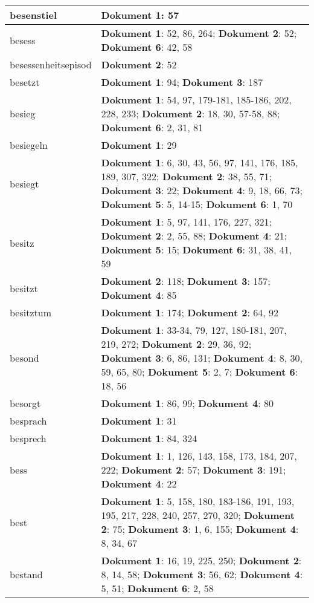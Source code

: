 \documentclass[a5paper]{article}
\begin{document}
\begin{longtable}[l]{|l|p{3in}|}
\hline
besenstiel & \textbf{Dokument 1}: 57 \\
\hline
besess & \textbf{Dokument 1}: 52, 86, 264; \textbf{Dokument 2}: 52; \textbf{Dokument 6}: 42, 58 \\
\hline
besessenheitsepisod & \textbf{Dokument 2}: 52 \\
\hline
besetzt & \textbf{Dokument 1}: 94; \textbf{Dokument 3}: 187 \\
\hline
besieg & \textbf{Dokument 1}: 54, 97, 179-181, 185-186, 202, 228, 233; \textbf{Dokument 2}: 18, 30, 57-58, 88; \textbf{Dokument 6}: 2, 31, 81 \\
\hline
besiegeln & \textbf{Dokument 1}: 29 \\
\hline
besiegt & \textbf{Dokument 1}: 6, 30, 43, 56, 97, 141, 176, 185, 189, 307, 322; \textbf{Dokument 2}: 38, 55, 71; \textbf{Dokument 3}: 22; \textbf{Dokument 4}: 9, 18, 66, 73; \textbf{Dokument 5}: 5, 14-15; \textbf{Dokument 6}: 1, 70 \\
\hline
besitz & \textbf{Dokument 1}: 5, 97, 141, 176, 227, 321; \textbf{Dokument 2}: 2, 55, 88; \textbf{Dokument 4}: 21; \textbf{Dokument 5}: 15; \textbf{Dokument 6}: 31, 38, 41, 59 \\
\hline
besitzt & \textbf{Dokument 2}: 118; \textbf{Dokument 3}: 157; \textbf{Dokument 4}: 85 \\
\hline
besitztum & \textbf{Dokument 1}: 174; \textbf{Dokument 2}: 64, 92 \\
\hline
besond & \textbf{Dokument 1}: 33-34, 79, 127, 180-181, 207, 219, 272; \textbf{Dokument 2}: 29, 36, 92; \textbf{Dokument 3}: 6, 86, 131; \textbf{Dokument 4}: 8, 30, 59, 65, 80; \textbf{Dokument 5}: 2, 7; \textbf{Dokument 6}: 18, 56 \\
\hline
besorgt & \textbf{Dokument 1}: 86, 99; \textbf{Dokument 4}: 80 \\
\hline
besprach & \textbf{Dokument 1}: 31 \\
\hline
besprech & \textbf{Dokument 1}: 84, 324 \\
\hline
bess & \textbf{Dokument 1}: 1, 126, 143, 158, 173, 184, 207, 222; \textbf{Dokument 2}: 57; \textbf{Dokument 3}: 191; \textbf{Dokument 4}: 22 \\
\hline
best & \textbf{Dokument 1}: 5, 158, 180, 183-186, 191, 193, 195, 217, 228, 240, 257, 270, 320; \textbf{Dokument 2}: 75; \textbf{Dokument 3}: 1, 6, 155; \textbf{Dokument 4}: 8, 34, 67 \\
\hline
bestand & \textbf{Dokument 1}: 16, 19, 225, 250; \textbf{Dokument 2}: 8, 14, 58; \textbf{Dokument 3}: 56, 62; \textbf{Dokument 4}: 5, 51; \textbf{Dokument 6}: 2, 58 \\

\end{longtable}
\end{document}
